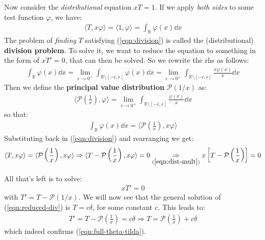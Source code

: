 \documentclass[../template.tex]{subfiles}
\begin{document}
\begin{expl}
Now consider the \textit{distributional} equation $x T =1$. If we apply \textit{both sides} to some test function $\varphi$, we have:
\begin{align} \label{eqn:division}
    \langle T, x \varphi \rangle = \langle 1, \varphi \rangle = \int_{\mathbb{R}} \varphi(x) \dd{x}
\end{align}  
The problem of \textit{finding} $T$ satisfying (\ref{eqn:division}) is called the (distributional) \textbf{division problem}. To solve it, we want to reduce the equation to something in the form of $x T' = 0$, that can then be solved. So we rewrite the rhs as follows:
\begin{align*}
    \int_{\mathbb{R}} \varphi(x) \dd{x} = \lim_{\epsilon \to 0^+} \int_{\mathbb{R} \setminus [-\epsilon, \epsilon]} \varphi(x) \dd{x} = \lim_{\epsilon \to 0^+} \int_{\mathbb{R}\setminus [-\epsilon, \epsilon]} \frac{x \varphi(x)}{x} \dd{x}
\end{align*}
Then we define the \textbf{principal value distribution} $\mathcal{P}(1/x)$ as:
\begin{align*}
    \langle \mathcal{P}\left(\frac{1}{x} \right), \varphi\rangle = \lim_{\epsilon \to 0^+} \int_{\mathbb{R} \setminus [-\epsilon, \epsilon]} \frac{\varphi(x)}{x} \dd{x} 
\end{align*} 
so that:
\begin{align*}
    \int_{\mathbb{R}}\varphi(x) \dd{x} = \langle \mathcal{P}\left(\frac{1}{x}\right), x\varphi \rangle
\end{align*}
Substituting back in (\ref{eqn:division}) and rearranging we get:
\begin{align*}
    \langle T, x \varphi \rangle = \langle \mathcal{P}\left(\frac{1}{x}\right), x\varphi \rangle \Rightarrow \langle T - \mathcal{P}\left(\frac{1}{x} \right), x \varphi \rangle = 0 \underset{(\ref{eqn:dist-mult})}{\Rightarrow}  
    x\left[T - \mathcal{P}\left(\frac{1}{x} \right)\right] = 0
\end{align*}
     

    All that's left is to solve:
    \begin{align}
        x T' = 0 \label{eqn:reduced-div}
    \end{align}
    with $T' = T - \mathcal{P}(1/x)$. We will now see that the general solution of (\ref{eqn:reduced-div}) is $T = c \delta$, for some constant $c$. This leads to:
    \begin{align*}
        T' = T - \mathcal{P}\left(\frac{1}{x} \right) = c \delta \Rightarrow T = \mathcal{P}\left(\frac{1}{x} \right) + c \delta
    \end{align*}
    which indeed confirms (\ref{eqn:full-theta-tilda}). 


\end{expl}
\end{document}
